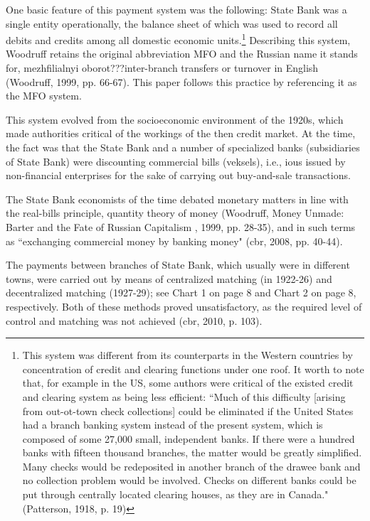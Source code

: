 One basic feature of this payment system was the following: State Bank was a single entity operationally, the balance sheet of which was used to record all debits and credits among all domestic economic units.\footnote{This system was different from its counterparts in the Western countries by concentration of credit and clearing functions under one roof. It worth to note that, for example in the US, some authors were critical of the existed credit and clearing system as being less efficient: ``Much of this difficulty [arising from out-ot-town check collections] could be eliminated if the United States had a branch banking system instead of the present system, which is composed of some 27,000 small, independent banks. If there were a hundred banks with fifteen thousand branches, the matter would be greatly simplified. Many checks would be redeposited in another branch of the drawee bank and no collection problem would be involved. Checks on different banks could be put through centrally located clearing houses, as they are in Canada." (Patterson, 1918, p. 19)} Describing this system, Woodruff retains the original abbreviation MFO and the Russian name it stands for, mezhfilialnyi oborot???inter-branch transfers or turnover in English (Woodruff, 1999, pp. 66-67). This paper follows this practice by referencing it as the MFO system.

This system evolved from the socioeconomic environment of the 1920s, which made authorities critical of the workings of the then credit market. At the time, the fact was that the State Bank and a number of specialized banks (subsidiaries of State Bank) were discounting commercial bills (veksels), i.e., \acp{iou} issued by non-financial enterprises for the sake of carrying out buy-and-sale transactions. 

The State Bank economists of the time debated monetary matters in line with the real-bills principle, quantity theory of money (Woodruff, Money Unmade: Barter and the Fate of Russian Capitalism , 1999, pp. 28-35), and in such terms as ``exchanging commercial money by banking money" (\ac{cbr}, 2008, pp. 40-44). 

The payments between branches of State Bank, which usually were in different towns, were carried out by means of centralized matching (in 1922-26) and decentralized matching (1927-29); see Chart 1 on page 8 and Chart 2 on page 8, respectively. Both of these methods proved unsatisfactory, as the required level of control and matching was not achieved (\ac{cbr}, 2010, p. 103). 

